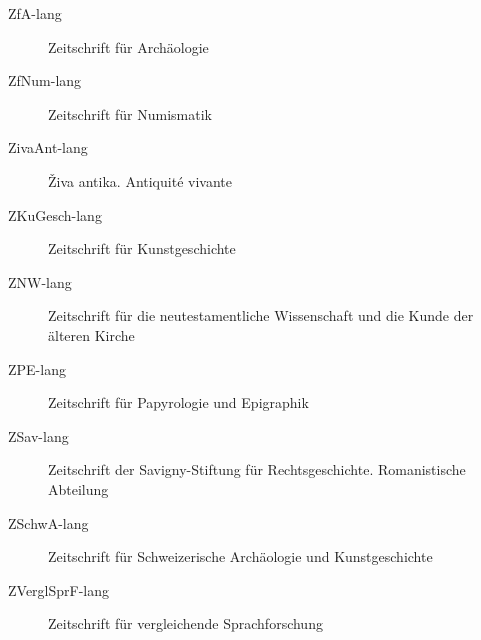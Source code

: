 \begin{footnotesize}
\begin{description}
\item[ZfA-lang] Zeitschrift für Archäologie 
\item[ZfNum-lang] Zeitschrift für Numismatik 
\item[ZivaAnt-lang] Živa antika. Antiquité vivante 
\item[ZKuGesch-lang] Zeitschrift für Kunstgeschichte 
\item[ZNW-lang] Zeitschrift für die neutestamentliche Wissenschaft und die Kunde der älteren Kirche 
\item[ZPE-lang] Zeitschrift für Papyrologie und Epigraphik 
\item[ZSav-lang] Zeitschrift der Savigny-Stiftung für Rechtsgeschichte. Romanistische Abteilung 
\item[ZSchwA-lang] Zeitschrift für Schweizerische Archäologie und Kunstgeschichte 
\item[ZVerglSprF-lang] Zeitschrift für vergleichende Sprachforschung 
\end{description}
\end{footnotesize}